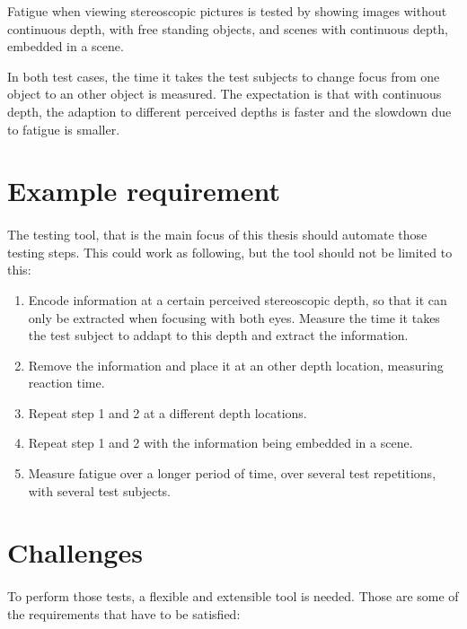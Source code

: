 \documentclass[11pt]{scrartcl}
\begin{document}
\begin{multicols}{2}
Fatigue when viewing stereoscopic pictures is tested by showing images without continuous depth, with free standing objects, and scenes with continuous depth, embedded in a scene.

In both test cases, the time it takes the test subjects to change focus from one object to an other object is measured. The expectation is that with continuous depth, the adaption to different perceived depths is faster and the slowdown due to fatigue is smaller.

\section{Example requirement}
\paragraph{}
The testing tool, that is the main focus of this thesis should automate those testing steps. This could work as following, but the tool should not be limited to this:

\begin{enumerate}
\item Encode information at a certain perceived stereoscopic depth, so that it can only be extracted when focusing with both eyes. Measure the time it takes the test subject to addapt to this depth and extract the information.
\item Remove the information and place it at an other depth location, measuring reaction time.
\item Repeat step 1 and 2 at a different depth locations.
\item Repeat step 1 and 2 with the information being embedded in a scene.
\item Measure fatigue over a longer period of time, over several test repetitions, with several test subjects.
\end{enumerate}

\section{Challenges}
\paragraph{}
To perform those tests, a flexible and extensible tool is needed. Those are some of the requirements that have to be satisfied:


\end{multicols}
\end{document}

